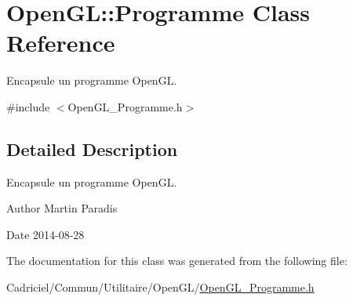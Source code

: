 \hypertarget{class_open_g_l_1_1_programme}{}\section{Open\+GL\+:\+:Programme Class Reference}
\label{class_open_g_l_1_1_programme}


Encapsule un programme Open\+GL.  




{\ttfamily \#include $<$Open\+G\+L\+\_\+\+Programme.\+h$>$}



\subsection{Detailed Description}
Encapsule un programme Open\+GL. 

\begin{DoxyAuthor}{Author}
Martin Paradis 
\end{DoxyAuthor}
\begin{DoxyDate}{Date}
2014-\/08-\/28 
\end{DoxyDate}


The documentation for this class was generated from the following file\+:\begin{DoxyCompactItemize}
\item 
Cadriciel/\+Commun/\+Utilitaire/\+Open\+G\+L/\hyperlink{_open_g_l___programme_8h}{Open\+G\+L\+\_\+\+Programme.\+h}\end{DoxyCompactItemize}

